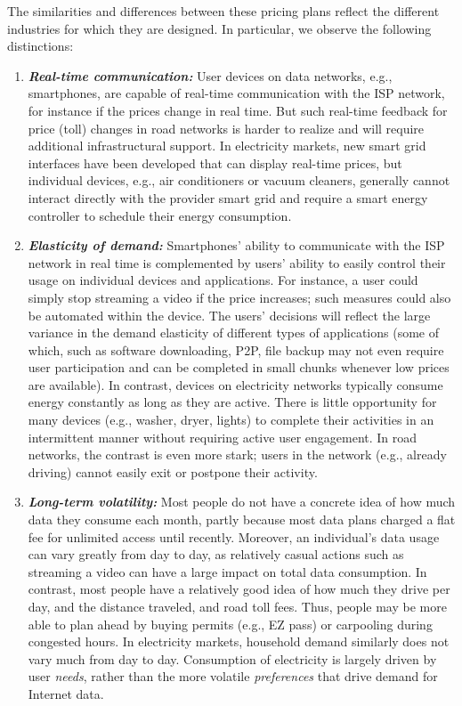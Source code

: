 The similarities and differences between these pricing plans reflect the different industries for which they are designed. In particular, we observe the following distinctions:
\begin{enumerate}
\item
\textbf{\emph{Real-time communication:}} User devices on data networks, e.g., smartphones, are capable of real-time communication with the ISP network, for instance if the prices change in real time. But such real-time feedback for price (toll) changes in road networks is harder to realize and will require additional infrastructural support. In electricity markets, new smart grid interfaces have been developed that can display real-time prices, but individual devices, e.g., air conditioners or vacuum cleaners, generally cannot interact directly with the provider smart grid and require a smart energy controller to schedule their energy consumption.
\item
\textbf{\emph{Elasticity of demand:}} Smartphones' ability to communicate with the ISP network in real time is complemented by users' ability to easily control their usage on individual devices and applications. For instance, a user could simply stop streaming a video if the price increases; such measures could also be automated within the device. The users' decisions will reflect the large variance in the demand elasticity of different types of applications (some of which, such as software downloading, P2P, file backup may not even require user participation and can be completed in small chunks whenever low prices are available). In contrast, devices on electricity networks typically consume energy constantly as long as they are active. There is little opportunity for many devices (e.g., washer, dryer, lights) to complete their activities in an intermittent manner without requiring active user engagement. In road networks, the contrast is even more stark; users in the network (e.g., already driving) cannot easily exit or postpone their activity.
\item
\textbf{\emph{Long-term volatility:}} Most people do not have a concrete idea of how much data they consume each month, partly because most data plans charged a flat fee for unlimited access until recently. Moreover, an individual's data usage can vary greatly from day to day, as relatively casual actions such as streaming a video can have a large impact on total data consumption. In contrast, most people have a relatively good idea of how much they drive per day, and the distance traveled, and road toll fees. Thus, people may be more able to plan ahead by buying permits (e.g., EZ pass) or carpooling during congested hours. In electricity markets, household demand similarly does not vary much from day to day. Consumption of electricity is largely driven by user \emph{needs}, rather than the more volatile \emph{preferences} that drive demand for Internet data.
\end{enumerate}
